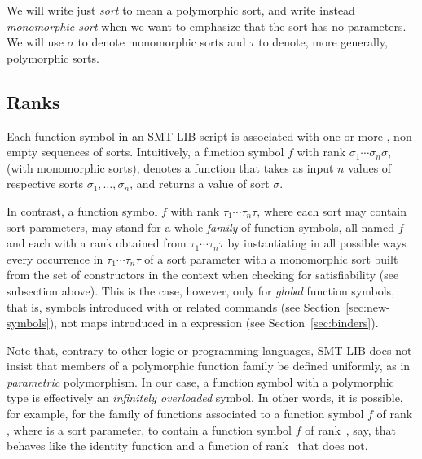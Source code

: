We will write just \emph{sort} to mean a polymorphic sort, and 
write instead \emph{monomorphic sort} when we want to emphasize 
that the sort has no parameters. 
We will use $\sigma$ to denote monomorphic sorts and 
$\tau$ to denote, more generally, polymorphic sorts.



\subsection{Ranks}

Each function symbol in an SMT-LIB script is associated with one or more 
, non-empty sequences of sorts.
Intuitively, a function symbol $f$ with rank $\sigma_1\cdots\sigma_n\sigma$,
(with monomorphic sorts),
denotes a function that takes as input $n$ values of respective sorts
$\sigma_1, \ldots, \sigma_n$,
and returns a value of sort $\sigma$.

In contrast, a function symbol $f$ with rank $\tau_1\cdots\tau_n\tau$,
where each sort may contain sort parameters,
may stand for a whole \emph{family} of function symbols, 
all named $f$ and each with a rank obtained from $\tau_1\cdots\tau_n\tau$ 
by instantiating in all possible ways every occurrence in $\tau_1\cdots\tau_n\tau$
of a sort parameter with a monomorphic sort built from the set of  constructors 
in the context when checking for satisfiability (see subsection above).
This is the case, however, only for \emph{global} function symbols, that is, 
symbols introduced with  or related commands 
(see Section~\ref{sec:new-symbols}), 
not maps introduced in a  expression (see Section~\ref{sec:binders}).

\begin{remark}
Note that, contrary to other logic or programming languages,
SMT-LIB does not insist that members of a polymorphic function family
be defined uniformly, as in \emph{parametric} polymorphism.
In our case, a function symbol with a polymorphic type is effectively
an \emph{infinitely overloaded} symbol.
In other words, it is possible, for example, for the family of functions
associated to a function symbol $f$ of rank ,
where  is a sort parameter,
to contain a function symbol $f$ of rank \,, say, 
that behaves like the identity function and 
a function of rank \, that does not.
\end{remark}



